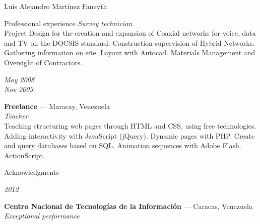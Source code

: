 \documentclass[11pt,letterpaper]{article}
\begin{document}
\begin{cv}{Luis Alejandro Mart\'inez Faneyth}
\begin{cvlist}{Professional experience}
{{		\textit{Survey technician}\\
		\footnotesize{Project Design for the creation and expansion of Coaxial networks for voice, data and TV on the DOCSIS standard. Construction supervision of Hybrid Networks. Gathering information on site. Layout with Autocad. Materials Management and Oversight of Contractors.}
	}
}
\item[{\parbox[t]{6em}{\textit{\large{May 2008\\Nov 2009}}}}]{
	\parbox[t]{\linewidth}{
		\textbf{Freelance} --- Maracay, Venezuela\\
		\textit{Teacher}\\
		\footnotesize{Teaching structuring web pages through HTML and CSS, using free technologies. Adding interactivity with JavaScript (jQuery). Dynamic pages with PHP. Create and query databases based on SQL. Animation sequences with Adobe Flash. ActionScript.}
	}
}
\end{cvlist}

\begin{cvlist}{Acknowledgments}
\item[{\parbox[t]{6em}{\textit{\large{2012}}}}]{
	\parbox[t]{\linewidth}{
		\textbf{Centro Nacional de Tecnolog\'ias de la Informaci\'on} --- Caracas, Venezuela\\
		\textit{Exceptional performance}
	}
}
\end{cvlist}


\end{cv}
\end{document}

